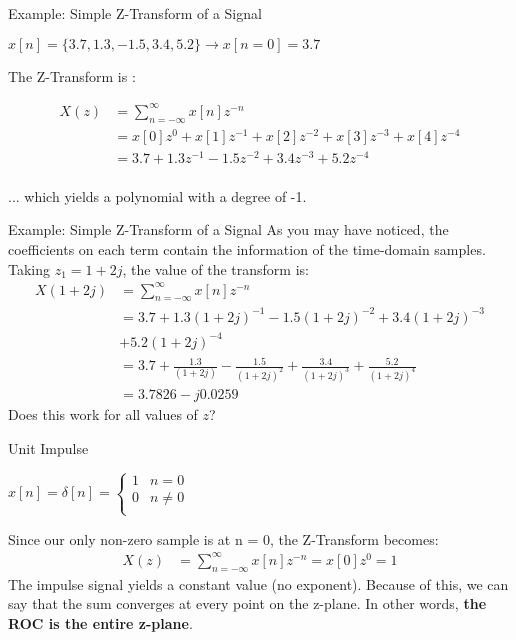 \documentclass{beamer}
\begin{document}
\begin{frame}{Example: Simple Z-Transform of a Signal}
    \begin{center}
    $ x[n] = \{3.7, 1.3, -1.5, 3.4, 5.2\} \longrightarrow x[n=0] = 3.7 $
    \end{center}
    The Z-Transform is :

    \begin{align*}
    {X(z)} &= \sum_{n=-\infty}^{\infty} x[n] z^{-n} \\
           &= x[0]z^{0} + x[1]z^{-1} + x[2]z^{-2} + x[3]z^{-3} + x[4]z^{-4}\\
           &= 3.7 + 1.3z^{-1} - 1.5z^{-2} + 3.4z^{-3} + 5.2z^{-4}\\
    \end{align*}
    
    ... which yields a polynomial with a degree of -1.
\end{frame}
\begin{frame}{Example: Simple Z-Transform of a Signal}
    As you may have noticed, the coefficients on each term contain the information of the time-domain samples.
    \newline \newline
    Taking $z_1 = 1 + 2j$, the value of the transform is:
    \begin{align*}
    {X(1+2j)} &= \sum_{n=-\infty}^{\infty} x[n] z^{-n} \\
              &= 3.7 + 1.3(1+2j)^{-1} - 1.5(1+2j)^{-2} + 3.4(1+2j)^{-3}\\ &+ 5.2(1+2j)^{-4}\\
              &= 3.7 + \frac{1.3}{(1+2j)} - \frac{1.5}{(1+2j)^2} + \frac{3.4}{(1+2j)^3} + \frac{5.2}{(1+2j)^4} \\
              &= 3.7826 - j0.0259
    \end{align*}
    Does this work for all values of $z$? %
\end{frame}

\begin{frame}{Unit Impulse}
    \begin{center}
    $ x[n] = \delta[n] =  
    \begin{cases}
        1 & n = 0\\
        0 & n \neq 0\\
    \end{cases} $
    \end{center}
    
    Since our only non-zero sample is at n = 0, the Z-Transform becomes:
    \begin{align*}
    {X(z)} &= \sum_{n=-\infty}^{\infty} x[n] z^{-n} = x[0]z^{0} = 1
    \end{align*}
    The impulse signal yields a constant value (no exponent). Because of this, we can say that the sum converges at every point on the z-plane. In other words, 
    \textbf{the ROC is the entire z-plane}.
\end{frame}
\end{document}
